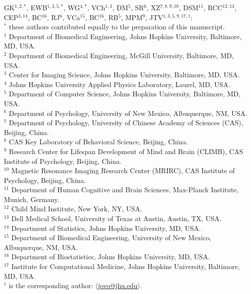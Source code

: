 \documentclass[11pt]{article}
\begin{document}
\vspace{10pt}
{\small
GK$^{1, 2, *}$, EWB$^{1, 3, 5, *}$, WG$^{4, *}$, VCh$^{1, 3}$, DM$^{5}$, SR$^{6}$, XZ$^{7,8,9,10}$, DSM$^{11}$, RCC$^{12, 13}$, CEP$^{3, 14}$, BC$^{16}$, RJ$^{6}$, VCa$^{15}$, BC$^{16}$, RB$^{5}$, MPM$^{9}$, JTV$^{1,3,5,9,17,\dagger}$: \\
${^*}$ these authors contributed equally to the preparation of this manuscript.\\
\noindent${^1}$ Department of Biomedical Engineering, Johns Hopkins University, Baltimore, MD, USA.\\
\noindent${^2}$ Department of Biomedical Engineering, McGill University, Baltimore, MD, USA.\\
\noindent${^3}$ Center for Imaging Science, Johns Hopkins University, Baltimore, MD, USA.\\
\noindent${^4}$ Johns Hopkins University Applied Physics Laboratory, Laurel, MD, USA.\\
\noindent${^5}$ Department of Computer Science, Johns Hopkins University, Baltimore, MD, USA.\\
\noindent${^6}$ Department of Psychology, University of New Mexico, Albuquerque, NM, USA. \\
\noindent${^7}$ Department of Psychology, University of Chinese Academy of Sciences (CAS), Beijing, China. \\
\noindent${^8}$ CAS Key Laboratory of Behavioral Science, Beijing, China. \\
\noindent${^9}$ Research Center for Lifespan Development of Mind and Brain (CLIMB), CAS Institute of Psychology, Beijing, China.\\
\noindent$^{10}$ Magnetic Resonance Imaging Research Center (MRIRC), CAS Institute of Psychology, Beijing, China.\\
\noindent$^{11}$ Department of Human Cognitive and Brain Sciences, Max-Planck Institute, Munich, Germany. \\
\noindent$^{12}$ Child Mind Institute, New York, NY, USA.\\
\noindent$^{13}$ Dell Medical School, University of Texas at Austin, Austin, TX, USA. \\
\noindent$^{14}$ Department of Statistics, Johns Hopkins University, MD, USA. \\
\noindent$^{15}$ Department of Biomedical Engineering, University of New Mexico, Albuquerque, NM, USA. \\
\noindent$^{16}$ Department of Biostatistics, Johns Hopkins University, MD, USA. \\
\noindent$^{17}$ Institute for Computational Medicine, Johns Hopkins University, Baltimore, MD, USA.\\
\noindent$^\dagger$ is the corresponding author: $\langle$\url{jovo@jhu.edu}$\rangle$}.
\end{document}
